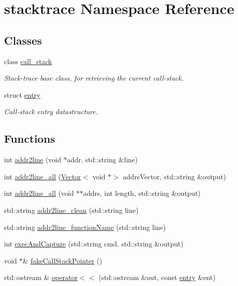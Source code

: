 \hypertarget{namespacestacktrace}{}\section{stacktrace Namespace Reference}
\label{namespacestacktrace}
\subsection*{Classes}
\begin{DoxyCompactItemize}
\item 
class \mbox{\hyperlink{classstacktrace_1_1call__stack}{call\+\_\+stack}}
\begin{DoxyCompactList}\small\item\em Stack-\/trace base class, for retrieving the current call-\/stack. \end{DoxyCompactList}\item 
struct \mbox{\hyperlink{structstacktrace_1_1entry}{entry}}
\begin{DoxyCompactList}\small\item\em Call-\/stack entry datastructure. \end{DoxyCompactList}\end{DoxyCompactItemize}
\subsection*{Functions}
\begin{DoxyCompactItemize}
\item 
int \mbox{\hyperlink{namespacestacktrace_a8ebfe19f3a27f6414cfce5805074fe42}{addr2line}} (void $\ast$addr, std\+::string \&line)
\item 
int \mbox{\hyperlink{namespacestacktrace_a9fe14c0a8fbf0b46e99d77f9160bc200}{addr2line\+\_\+all}} (\mbox{\hyperlink{classVector}{Vector}}$<$ void $\ast$$>$ addrs\+Vector, std\+::string \&output)
\item 
int \mbox{\hyperlink{namespacestacktrace_a179c9d83db84c7fa809a4ab21d580d4b}{addr2line\+\_\+all}} (void $\ast$$\ast$addrs, int length, std\+::string \&output)
\item 
std\+::string \mbox{\hyperlink{namespacestacktrace_a053d4a96859b0cc3ef59c8126a6d9853}{addr2line\+\_\+clean}} (std\+::string line)
\item 
std\+::string \mbox{\hyperlink{namespacestacktrace_a66a338ef12661ae6dfd0b13a40328d20}{addr2line\+\_\+function\+Name}} (std\+::string line)
\item 
int \mbox{\hyperlink{namespacestacktrace_a0ac07ad3feb21bf6bb2f3728b1ff569d}{exec\+And\+Capture}} (std\+::string cmd, std\+::string \&output)
\item 
void $\ast$\& \mbox{\hyperlink{namespacestacktrace_a30a6d3fa1d0572c74ba3ea308866bba8}{fake\+Call\+Stack\+Pointer}} ()
\item 
std\+::ostream \& \mbox{\hyperlink{namespacestacktrace_a9cdc7f5a1e1c1f53958a3804334ae6c7}{operator$<$$<$}} (std\+::ostream \&out, const \mbox{\hyperlink{structstacktrace_1_1entry}{entry}} \&ent)
\end{DoxyCompactItemize}


